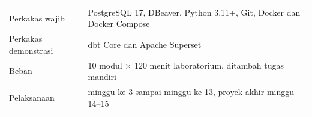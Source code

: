 \vfill
\noindent
\begin{minipage}{\linewidth}
  \footnotesize\color{Slate}
  \begin{tabular}{@{}p{3.4cm}p{\dimexpr\linewidth-3.9cm}@{}}
    Perkakas wajib & PostgreSQL 17, DBeaver, Python 3.11+, Git,
                     Docker dan Docker Compose \\
    Perkakas demonstrasi & dbt Core dan Apache Superset \\
    Beban & 10 modul $\times$ 120 menit laboratorium, ditambah tugas mandiri \\
    Pelaksanaan & minggu ke-3 sampai minggu ke-13, proyek akhir minggu 14--15 \\
  \end{tabular}
\end{minipage}

\vspace{.7cm}
\noindent\brandrule
\clearpage
